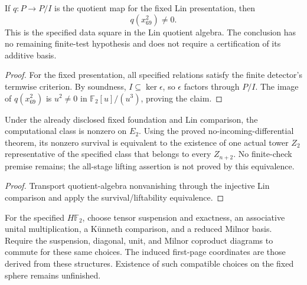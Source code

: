 \begin{theorem}
  \label{thm:lin-square-certified}
  \leanok
  If $q:P\to P/I$ is the quotient map for the fixed Lin presentation, then
  \[
    q(x_{69}^2)\ne0.
  \]
  This is the specified data square in the Lin quotient algebra. The
  conclusion has no remaining finite-test hypothesis and does not require
  a certification of its additive basis.
\end{theorem}
\begin{proof}
  For the fixed presentation, all specified relations satisfy the finite
  detector's termwise criterion. By soundness, $I\subseteq\ker\epsilon$,
  so $\epsilon$ factors through $P/I$. The image of $q(x_{69}^2)$ is
  $u^2\ne0$ in $\mathbb F_2[u]/(u^3)$, proving the claim.
  \leanok
\end{proof}

\begin{proposition}
  \label{prop:h6-certified-nonvanishing}
  \notready
  Under the already disclosed fixed foundation and Lin comparison, the
  computational class is nonzero on $E_2$. Using the proved
  no-incoming-differential theorem, its nonzero survival is equivalent to
  the existence of one actual tower $Z_2$ representative of the specified
  class that belongs to every $Z_{n+2}$. No finite-check premise remains;
  the all-stage lifting assertion is not proved by this equivalence.
\end{proposition}
\begin{proof}
  Transport quotient-algebra nonvanishing through the injective Lin
  comparison and apply the survival/liftability equivalence.
\end{proof}

\begin{definition}
  \label{def:stage-zero-cooperation-contract}
  \leanok
  For the specified $H\mathbb F_2$, choose tensor suspension and exactness,
  an associative unital multiplication, a K\"unneth comparison, and a
  reduced Milnor basis. Require the suspension, diagonal, unit, and Milnor
  coproduct diagrams to commute for these same choices. The induced
  first-page coordinates are those derived from these structures.
  Existence of such compatible choices on the fixed sphere remains
  unfinished.
\end{definition}

